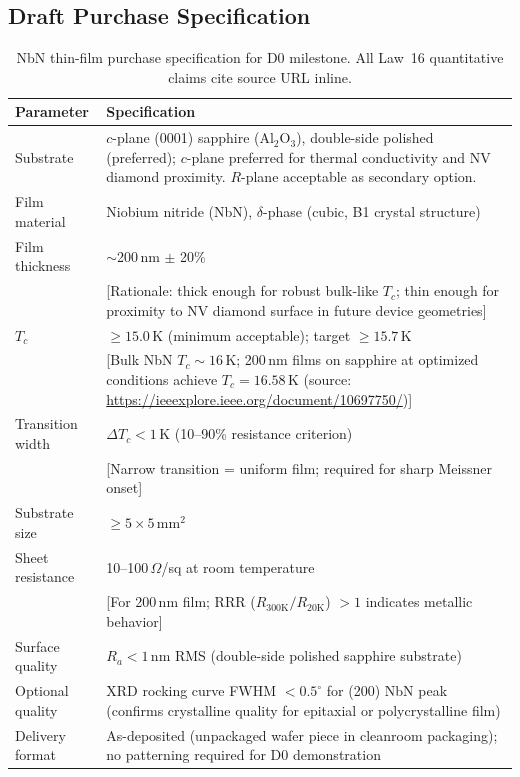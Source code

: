 \subsection{Draft Purchase Specification}
\label{sec:nbn_spec}

\begin{table}[ht]
\centering
\caption{NbN thin-film purchase specification for D0 milestone.
  All Law~16 quantitative claims cite source URL inline.}
\label{tab:nbn_spec}
\small
\begin{tabular}{@{}p{4cm}p{9cm}@{}}
\toprule
Parameter & Specification \\
\midrule
Substrate & $c$-plane (0001) sapphire (Al$_2$O$_3$), double-side polished (preferred);
  $c$-plane preferred for thermal conductivity and NV diamond proximity.
  $R$-plane acceptable as secondary option. \\
Film material & Niobium nitride (NbN), $\delta$-phase (cubic, B1 crystal structure) \\
Film thickness & $\sim$200\,nm $\pm$ 20\% \\
  & [Rationale: thick enough for robust bulk-like $T_c$; thin enough for
    proximity to NV diamond surface in future device geometries] \\
$T_c$ & $\geq 15.0$\,K (minimum acceptable); target $\geq 15.7$\,K \\
  & [Bulk NbN $T_c \sim 16$\,K; 200\,nm films on sapphire at optimized
    conditions achieve $T_c = 16.58$\,K
    (source: \url{https://ieeexplore.ieee.org/document/10697750/})] \\
Transition width & $\Delta T_c < 1$\,K (10--90\% resistance criterion) \\
  & [Narrow transition = uniform film; required for sharp Meissner onset] \\
Substrate size & $\geq 5 \times 5$\,mm$^2$ \\
Sheet resistance & 10--100\,$\Omega$/sq at room temperature \\
  & [For 200\,nm film; RRR ($R_{300\text{K}}/R_{20\text{K}}$) $> 1$ indicates metallic behavior] \\
Surface quality & $R_a < 1$\,nm RMS (double-side polished sapphire substrate) \\
Optional quality & XRD rocking curve FWHM $< 0.5^\circ$ for (200) NbN peak
  (confirms crystalline quality for epitaxial or polycrystalline film) \\
Delivery format & As-deposited (unpackaged wafer piece in cleanroom packaging);
  no patterning required for D0 demonstration \\
\bottomrule
\end{tabular}
\end{table}

